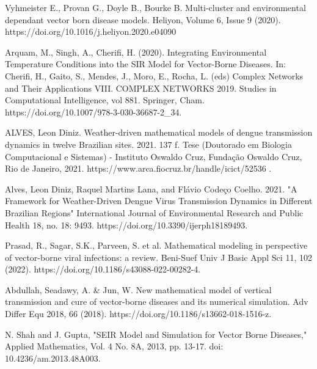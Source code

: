 \documentclass[12pt]{article}
\begin{document}
\noindent [3] Vyhmeister E., Provan G., Doyle B., Bourke B. Multi-cluster and environmental dependant vector born disease models. Heliyon, Volume 6, Issue 9 (2020). https://doi.org/10.1016/j.heliyon.2020.e04090

\noindent [4] Arquam, M., Singh, A., Cherifi, H. (2020). Integrating Environmental Temperature Conditions into the SIR Model for Vector-Borne Diseases. In: Cherifi, H., Gaito, S., Mendes, J., Moro, E., Rocha, L. (eds) Complex Networks and Their Applications VIII. COMPLEX NETWORKS 2019. Studies in Computational Intelligence, vol 881. Springer, Cham. https://doi.org/10.1007/978-3-030-36687-2\_34.

\noindent [5] ALVES, Leon Diniz. Weather-driven mathematical models of dengue transmission dynamics in twelve Brazilian sites. 2021. 137 f. Tese (Doutorado em Biologia Computacional e Sistemas) - Instituto Oswaldo Cruz, Fundação Oswaldo Cruz, Rio de Janeiro, 2021. https://www.arca.fiocruz.br/handle/icict/52536	.

\noindent [6] Alves, Leon Diniz, Raquel Martins Lana, and Flávio Codeço Coelho. 2021. "A Framework for Weather-Driven Dengue Virus Transmission Dynamics in Different Brazilian Regions" International Journal of Environmental Research and Public Health 18, no. 18: 9493. https://doi.org/10.3390/ijerph18189493.

\noindent [7] Prasad, R., Sagar, S.K., Parveen, S. et al. Mathematical modeling in perspective of vector-borne viral infections: a review. Beni-Suef Univ J Basic Appl Sci 11, 102 (2022). https://doi.org/10.1186/s43088-022-00282-4.

\noindent [8] Abdullah, Seadawy, A. & Jun, W. New mathematical model of vertical transmission and cure of vector-borne diseases and its numerical simulation. Adv Differ Equ 2018, 66 (2018). https://doi.org/10.1186/s13662-018-1516-z.

\noindent [9] N. Shah and J. Gupta, "SEIR Model and Simulation for Vector Borne Diseases," Applied Mathematics, Vol. 4 No. 8A, 2013, pp. 13-17. doi: 10.4236/am.2013.48A003.
\end{document}
